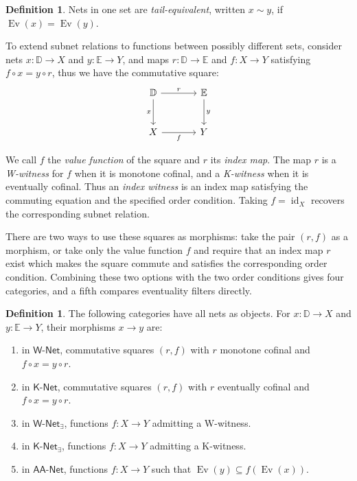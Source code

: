 \documentclass[11pt,a4paper]{article}
\theoremstyle{definition}
\newtheorem{definition}[theorem]{Definition}
\theoremstyle{remark}
\newcommand{\Wpar}{\mathsf{W\text{-}Net}}
\newcommand{\Kpar}{\mathsf{K\text{-}Net}}
\newcommand{\Wex}{\mathsf{W\text{-}Net}_{\exists}}
\newcommand{\Kex}{\mathsf{K\text{-}Net}_{\exists}}
\newcommand{\NetAA}{\mathsf{AA\text{-}Net}}
\newcommand{\Ev}{\operatorname{Ev}}
\newcommand{\id}{\operatorname{id}}
\begin{document}
\begin{definition}\label{def:tailequivalence}
Nets in one set are \emph{tail-equivalent}, written \(x\sim y\),
if \(\Ev(x)=\Ev(y)\).
\end{definition}

To extend subnet relations to functions between possibly different
sets, consider nets \(x:\mathbb{D}\to X\) and \(y:\mathbb{E}\to Y\),
and maps \(r:\mathbb{D}\to\mathbb{E}\) and \(f:X\to Y\) satisfying
\(f\circ x=y\circ r\), thus we have the commutative square:
\begin{equation}\label{eq:square}
 \begin{tikzcd}[row sep=large,column sep=large]
 \mathbb{D}\arrow[r,"r"]\arrow[d,"x"']&\mathbb{E}\arrow[d,"y"]\\
 X\arrow[r,"f"']&Y
 \end{tikzcd}
\end{equation}

We call \(f\) the \emph{value function} of the square and \(r\) its
\emph{index map}. The map \(r\) is a \emph{W-witness} for \(f\) when it is
monotone cofinal, and a \emph{K-witness} when it is eventually cofinal.
Thus an \emph{index witness} is an index map satisfying the commuting
equation and the specified order condition. Taking \(f=\id_X\)
recovers the corresponding subnet relation.

There are two ways to use these squares as morphisms: take the pair
\((r,f)\) as a morphism, or take only the value function \(f\) and
require that an index map \(r\) exist which makes the square commute
and satisfies the corresponding order condition. Combining these two
options with the two order conditions gives four categories, and a
fifth compares eventuality filters directly.
\begin{definition}\label{def:categories}
The following categories have all nets as objects.
For \(x:\mathbb{D}\to X\) and \(y:\mathbb{E}\to Y\), their morphisms \(x\to y\) are:
\begin{enumerate}[label=(\roman*)]
\item in \(\Wpar\), commutative squares \((r,f)\) with \(r\) monotone cofinal and
\(f\circ x=y\circ r\).
\item in \(\Kpar\), commutative squares \((r,f)\) with \(r\) eventually cofinal and
\(f\circ x=y\circ r\).
\item in \(\Wex\), functions \(f:X\to Y\) admitting a W-witness.
\item in \(\Kex\), functions \(f:X\to Y\) admitting a K-witness.
\item in \(\NetAA\), functions \(f:X\to Y\) such that
\(\Ev(y)\subseteq f(\Ev(x))\).
\end{enumerate}
\end{definition}
\end{document}
